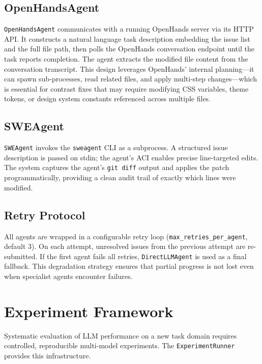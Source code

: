 \documentclass[10pt,conference]{IEEEtran}
\begin{document}
\subsection{OpenHandsAgent}

\texttt{OpenHandsAgent} communicates with a running OpenHands server via its
HTTP API.  It constructs a natural language task description embedding the
issue list and the full file path, then polls the OpenHands conversation
endpoint until the task reports completion.  The agent extracts the modified
file content from the conversation transcript.  This design leverages
OpenHands' internal planning—it can spawn sub-processes, read related files,
and apply multi-step changes—which is essential for contrast fixes that may
require modifying CSS variables, theme tokens, or design system constants
referenced across multiple files.

\subsection{SWEAgent}

\texttt{SWEAgent} invokes the \texttt{sweagent} CLI as a subprocess.  A
structured issue description is passed on stdin; the agent's ACI enables
precise line-targeted edits.  The system captures the agent's \texttt{git
diff} output and applies the patch programmatically, providing a clean audit
trail of exactly which lines were modified.

\subsection{Retry Protocol}

All agents are wrapped in a configurable retry loop
(\texttt{max\_retries\_per\_agent}, default 3).  On each attempt, unresolved
issues from the previous attempt are re-submitted.  If the first agent fails
all retries, \texttt{DirectLLMAgent} is used as a final fallback.  This
degradation strategy ensures that partial progress is not lost even when
specialist agents encounter failures.

\section{Experiment Framework}
\label{sec:experiments}

Systematic evaluation of LLM performance on a new task domain requires
controlled, reproducible multi-model experiments.  The
\texttt{ExperimentRunner} provides this infrastructure.
\end{document}
